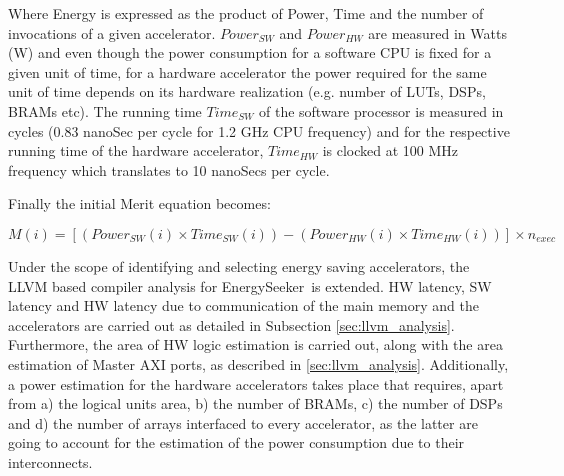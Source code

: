 \documentclass[]{usiinfthesis}
\newcommand{\eseeker}{{EnergySeeker}}
\begin{document}
Where Energy is expressed as the product of Power, Time and the number of invocations of a 
given accelerator. $Power_{SW}$ and $Power_{HW}$ are measured in Watts (W) and even though 
the power consumption for a software CPU is fixed for a given unit of time, for a hardware 
accelerator the power required for the same unit of time depends on its hardware realization 
(e.g. number of LUTs, DSPs, BRAMs etc). The running time $Time_{SW}$ of the software processor 
is measured in cycles (0.83 nanoSec per cycle for 1.2 GHz CPU frequency) and for the respective
running time of the hardware accelerator, $Time_{HW}$ is clocked at 100 MHz frequency which
translates to 10 nanoSecs per cycle.

Finally the initial Merit equation becomes: 

\begin{equation*}
M(i)  = [ (Power_{SW}(i) \times Time_{SW}(i)) - (Power_{HW}(i) \times Time_{HW}(i)) ] \times n_{exec}
\end{equation*}




Under the scope of identifying and selecting energy saving accelerators, the LLVM based compiler 
analysis for \eseeker\ is extended. HW latency, SW latency and HW latency due to communication
of the main memory and the accelerators are carried out as detailed in Subsection 
\ref{sec:llvm_analysis}. Furthermore, the area of HW logic estimation is carried out, along
with the area estimation of Master AXI ports, as described in \ref{sec:llvm_analysis}. Additionally,
a power estimation for the hardware accelerators takes place that requires, apart from a) the logical
units area, b) the number of BRAMs, c) the number of DSPs and d) the number of arrays interfaced to every 
accelerator, as the latter are going to account for the estimation of the power consumption due to
their interconnects.
\end{document}
